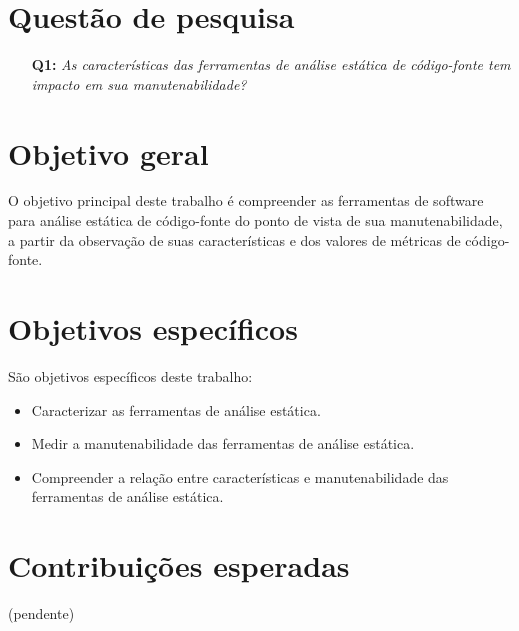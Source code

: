 \section{Questão de pesquisa}

\begin{enumerate}
  \item [{\bf Q1:}] {\em As características das ferramentas de análise estática
  de código-fonte tem impacto em sua manutenabilidade?}
\end{enumerate}

\section{Objetivo geral}

O objetivo principal deste trabalho é compreender as ferramentas de software
para análise estática de código-fonte do ponto de vista de sua
manutenabilidade, a partir da observação de suas características e dos valores
de métricas de código-fonte.

\section{Objetivos específicos}

São objetivos específicos deste trabalho:

\begin{itemize}
  \item Caracterizar as ferramentas de análise estática.
  \item Medir a manutenabilidade das ferramentas de análise estática.
  \item Compreender a relação entre características e manutenabilidade
        das ferramentas de análise estática.
\end{itemize}

\section{Contribuições esperadas}

(pendente)

%

